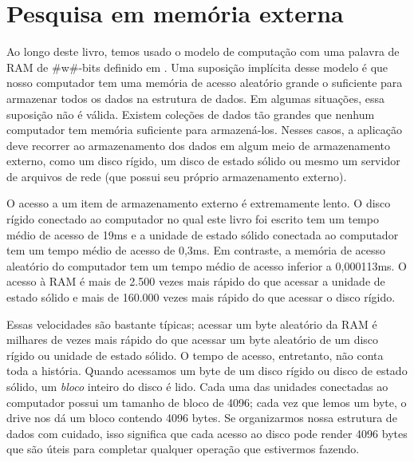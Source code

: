 \chapter{Pesquisa em memória externa}

Ao longo deste livro, temos usado o modelo de computação com uma palavra de RAM de #w#-bits definido em . Uma suposição implícita desse modelo é que nosso computador tem uma memória de acesso aleatório grande o suficiente para armazenar todos os dados na estrutura de dados. Em algumas situações, essa suposição não é válida. Existem coleções de dados tão grandes que nenhum computador tem memória suficiente para armazená-los. Nesses casos, a aplicação deve recorrer ao armazenamento dos dados em algum meio de armazenamento externo, como um disco rígido, um disco de estado sólido ou mesmo um servidor de arquivos de rede (que possui seu próprio armazenamento externo).

%
%
%
%
O acesso a um item de armazenamento externo é extremamente lento. O disco rígido conectado ao computador no qual este livro foi escrito tem um tempo médio de acesso de 19ms e a unidade de estado sólido conectada ao computador tem um tempo médio de acesso de 0,3ms. Em contraste, a memória de acesso aleatório do computador tem um tempo médio de acesso inferior a 0,000113ms. O acesso à RAM é mais de 2.500 vezes mais rápido do que acessar a unidade de estado sólido e mais de 160.000 vezes mais rápido do que acessar o disco rígido.

% 
% 

Essas velocidades são bastante típicas; acessar um byte aleatório da RAM é milhares de vezes mais rápido do que acessar um byte aleatório de um disco rígido ou unidade de estado sólido. O tempo de acesso, entretanto, não conta toda a história. Quando acessamos um byte de um disco rígido ou disco de estado sólido, um \emph{bloco} inteiro
%
do disco é lido.  Cada uma das unidades conectadas ao computador possui um tamanho de bloco de 4096; cada vez que lemos um byte, o drive nos dá um bloco contendo 4096 bytes. Se organizarmos nossa estrutura de dados com cuidado, isso significa que cada acesso ao disco pode render 4096 bytes que são úteis para completar qualquer operação que estivermos fazendo.


